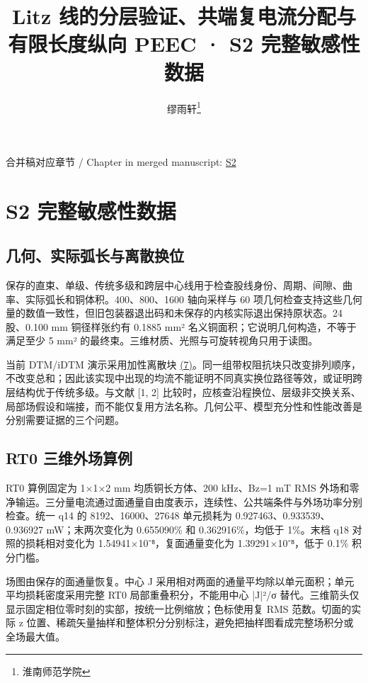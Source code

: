 \documentclass[journal,10pt]{IEEEtran}
\begin{document}
\title{Litz 线的分层验证、共端复电流分配与有限长度纵向 PEEC · S2 完整敏感性数据}
\author{缪雨轩\thanks{淮南师范学院}}

\maketitle
\noindent 合并稿对应章节 / Chapter in merged manuscript: \href{paper_zh-CN_ieee.pdf#chapter-S2}{S2}\par
\FloatBarrier
\section*{S2 完整敏感性数据}
\hypertarget{chapter-S2}{}
\subsection*{几何、实际弧长与离散换位}
\hypertarget{S2.geometry.heading}{}
保存的直束、单级、传统多级和跨层中心线用于检查股线身份、周期、间隙、曲率、实际弧长和铜体积。400、800、1600 轴向采样与 60 项几何检查支持这些几何量的数值一致性，但旧包装器退出码和未保存的内核实际退出保持原状态。24 股、0.100 mm 铜径样张约有 0.1885 mm² 名义铜面积；它说明几何构造，不等于满足至少 5 mm² 的最终束。三维材质、光照与可旋转视角只用于读图。


当前 DTM/iDTM 演示采用加性离散块 \href{paper_zh-CN_ieee.pdf#E06}{(7)}。同一组带权阻抗块只改变排列顺序，不改变总和；因此该实现中出现的均流不能证明不同真实换位路径等效，或证明跨层结构优于传统多级。与文献 [1, 2] 比较时，应核查沿程换位、层级非交换关系、局部场假设和端接，而不能仅复用方法名称。几何公平、模型充分性和性能改善是分别需要证据的三个问题。


\subsection*{RT0 三维外场算例}
\hypertarget{S2.rt0.heading}{}
RT0 算例固定为 1×1×2 mm 均质铜长方体、200 kHz、Bz=1 mT RMS 外场和零净输运。三分量电流通过面通量自由度表示，连续性、公共端条件与外场功率分别检查。统一 q14 的 8192、16000、27648 单元损耗为 0.927463、0.933539、0.936927 mW；末两次变化为 0.655090\% 和 0.362916\%，均低于 1\%。末档 q18 对照的损耗相对变化为 1.54941×10⁻⁸，复面通量变化为 1.39291×10⁻⁸，低于 0.1\% 积分门槛。


场图由保存的面通量恢复。中心 J 采用相对两面的通量平均除以单元面积；单元平均损耗密度采用完整 RT0 局部重叠积分，不能用中心 |J|²/σ 替代。三维箭头仅显示固定相位零时刻的实部，按统一比例缩放；色标使用复 RMS 范数。切面的实际 z 位置、稀疏矢量抽样和整体积分分别标注，避免把抽样图看成完整场积分或全场最大值。
\end{document}

